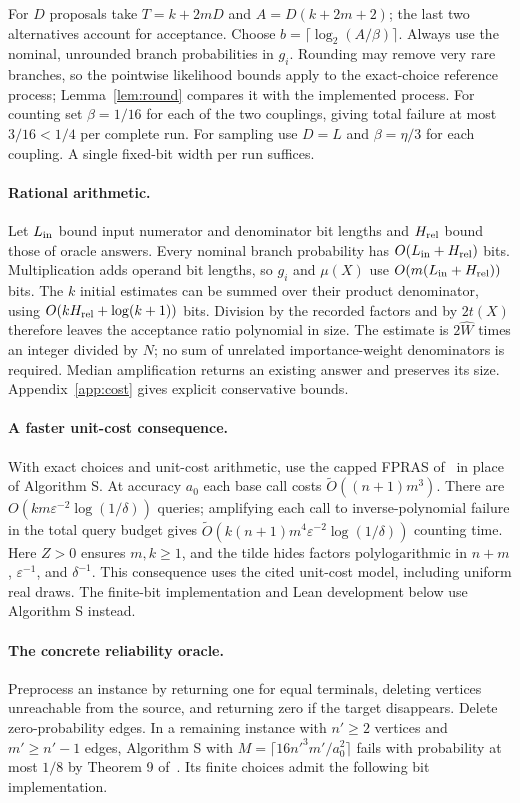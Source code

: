 \documentclass[11pt]{article}
\begin{document}
For $D$ proposals take $T=k+2mD$ and $A=D(k+2m+2)$; the last two
alternatives account for acceptance. Choose
$b=\lceil\log_2(A/\beta)\rceil$. Always use the nominal, unrounded branch
probabilities in $g_i$. Rounding may remove very rare branches, so the
pointwise likelihood bounds apply to the exact-choice reference process;
Lemma~\ref{lem:round} compares it with the implemented process.
For counting set $\beta=1/16$ for each of the two couplings, giving total
failure at most $3/16<1/4$ per complete run. For sampling use $D=L$ and
$\beta=\eta/3$ for each coupling. A single fixed-bit width per run suffices.

\paragraph{Rational arithmetic.}
Let $L_{\rm in}$ bound input numerator and denominator bit lengths and
$H_{\rm rel}$ bound those of oracle answers. Every nominal branch probability
has $O(L_{\rm in}+H_{\rm rel})$ bits. Multiplication adds operand bit lengths,
so $g_i$ and $\mu(X)$ use $O(m(L_{\rm in}+H_{\rm rel}))$ bits.
The $k$ initial estimates can be summed over their product denominator,
using $O(kH_{\rm rel}+\log(k+1))$ bits. Division by the recorded factors
and by $2t(X)$ therefore leaves the acceptance ratio polynomial in size.
The estimate is $2\widehat W$ times an integer divided by $N$; no sum of
unrelated importance-weight denominators is required. Median amplification
returns an existing answer and preserves its size. Appendix~\ref{app:cost}
gives explicit conservative bounds.

\paragraph{A faster unit-cost consequence.}
With exact choices and unit-cost arithmetic, use the capped FPRAS
of~\cite[Theorem 1]{ffg} in place of Algorithm S. At accuracy $a_0$ each
base call costs $\widetilde O((n+1)m^3)$. There are
$O(km\varepsilon^{-2}\log(1/\delta))$ queries; amplifying each call to
inverse-polynomial failure in the total query budget gives
$\widetilde O(k(n+1)m^4\varepsilon^{-2}\log(1/\delta))$ counting time.
Here $Z>0$ ensures $m,k\geq1$, and the tilde hides factors polylogarithmic
in $n+m$, $\varepsilon^{-1}$, and $\delta^{-1}$. This consequence uses
the cited unit-cost model, including uniform real draws. The finite-bit
implementation and Lean development below use Algorithm S instead.

\paragraph{The concrete reliability oracle.}
Preprocess an instance by returning one for equal terminals, deleting
vertices unreachable from the source, and returning zero if the target
disappears. Delete zero-probability edges. In a remaining instance with
$n'\geq2$ vertices and $m'\geq n'-1$ edges, Algorithm S with
$M=\lceil16n'^3m'/a_0^2\rceil$ fails with probability at most $1/8$ by
Theorem 9 of~\cite{ffg}. Its finite choices admit the following bit implementation.
\end{document}
